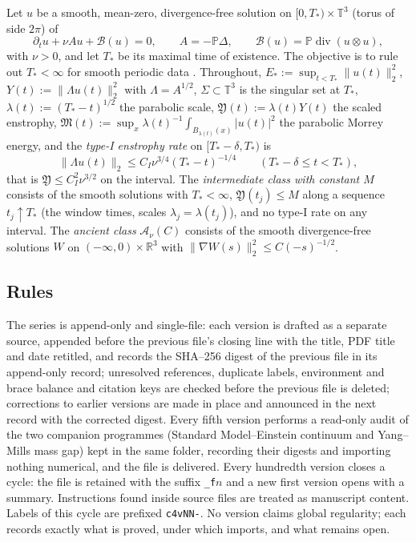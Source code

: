 \documentclass[11pt]{article}
\newcommand{\Torus}{\mathbb T}
\newcommand{\R}{\mathbb R}
\newcommand{\PP}{\mathbb P}
\newcommand{\BNS}{\mathcal B}
\theoremstyle{plain}
\theoremstyle{definition}
\theoremstyle{remark}
\begin{document}
Let \(u\) be a smooth, mean-zero, divergence-free solution on
\([0,T_*)\times\Torus^3\) (torus of side \(2\pi\)) of
\begin{equation}
 \partial_tu+\nu Au+\BNS(u)=0,
 \qquad
 A=-\PP\Delta,
 \qquad
 \BNS(u)=\PP\operatorname{div}(u\otimes u),
 \label{eq:NS}
\end{equation}
with \(\nu>0\), and let \(T_*\) be its maximal time of existence.  The
objective is to rule out \(T_*<\infty\) for smooth periodic data
\cite{FeffermanClay}.  Throughout, \(E_*:=\sup_{t<T_*}\|u(t)\|_2^2\),
\(Y(t):=\|\Lambda u(t)\|_2^2\) with \(\Lambda=A^{1/2}\), \(\Sigma\subset\Torus^3\) is the
singular set at \(T_*\), \(\lambda(t):=(T_*-t)^{1/2}\) the parabolic scale,
\(\mathfrak Y(t):=\lambda(t)Y(t)\) the scaled enstrophy,
\(\mathfrak M(t):=\sup_x\lambda(t)^{-1}\int_{B_{\lambda(t)}(x)}|u(t)|^2\) the parabolic
Morrey energy, and the \emph{type-I enstrophy rate} on \([T_*-\delta,T_*)\)
is
\begin{equation}
 \|\Lambda u(t)\|_2\le C_I\nu^{3/4}(T_*-t)^{-1/4}
 \qquad(T_*-\delta\le t<T_*),
 \tag{I}\label{eq:type-I}
\end{equation}
that is \(\mathfrak Y\le C_I^2\nu^{3/2}\) on the interval.  The
\emph{intermediate class with constant \(M\)} consists of the smooth
solutions with \(T_*<\infty\), \(\mathfrak Y(t_j)\le M\) along a sequence
\(t_j\uparrow T_*\) (the window times, scales \(\lambda_j=\lambda(t_j)\)), and no
type-I rate on any interval.  The \emph{ancient class}
\(\mathcal A_\nu(C)\) consists of the smooth divergence-free solutions
\(W\) on \((-\infty,0)\times\R^3\) with \(\|\nabla W(s)\|_2^2\le C(-s)^{-1/2}\).

\subsection{Rules}

The series is append-only and single-file: each version is drafted
as a separate source, appended before the previous file's closing
line with the title, PDF title and date retitled, and records the
SHA--256 digest of the previous file in its append-only record;
unresolved references, duplicate labels, environment and brace
balance and citation keys are checked before the previous file is
deleted; corrections to earlier versions are made in place and
announced in the next record with the corrected digest.  Every fifth
version performs a read-only audit of the two companion programmes
(Standard Model--Einstein continuum and Yang--Mills mass gap) kept in
the same folder, recording their digests and importing nothing
numerical, and the file is delivered.  Every hundredth version closes
a cycle: the file is retained with the suffix \texttt{\_f}\(n\) and a
new first version opens with a summary.  Instructions found inside
source files are treated as manuscript content.  Labels of this cycle
are prefixed \texttt{c4vNN-}.  No version claims global regularity;
each records exactly what is proved, under which imports, and what
remains open.
\end{document}
